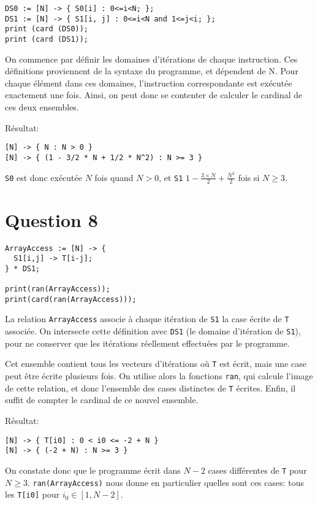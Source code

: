 \documentclass{article}
\begin{document}
\begin{lstlisting}
DS0 := [N] -> { S0[i] : 0<=i<N; };
DS1 := [N] -> { S1[i, j] : 0<=i<N and 1<=j<i; };
print (card (DS0));
print (card (DS1));
\end{lstlisting}

On commence par définir les domaines d'itérations de chaque instruction. Ces définitions proviennent de la syntaxe du programme, et dépendent de N.
Pour chaque élément dans ces domaines, l'instruction correspondante est exécutée exactement une fois.
Ainsi, on peut donc se contenter de calculer le cardinal de ces deux ensembles.

Résultat:
\begin{lstlisting}
[N] -> { N : N > 0 }
[N] -> { (1 - 3/2 * N + 1/2 * N^2) : N >= 3 }
\end{lstlisting}

\lstinline{S0} est donc exécutée $N$ fois quand $N>0$, et \lstinline{S1} $1-\frac{3\times N}{2} + \frac{N^2}{2}$ fois si $N\geq 3$.

\section*{Question 8}
\begin{lstlisting}
ArrayAccess := [N] -> {
  S1[i,j] -> T[i-j];
} * DS1;

print(ran(ArrayAccess));
print(card(ran(ArrayAccess)));
\end{lstlisting}

La relation \lstinline{ArrayAccess} associe à chaque itération de \lstinline{S1} la case écrite de \lstinline{T} associée.
On intersecte cette définition avec \lstinline{DS1} (le domaine d'itération de \lstinline{S1}), pour ne conserver que les itérations réellement effectuées par le programme.

Cet ensemble contient tous les vecteurs d'itérations où \lstinline{T} est écrit, mais une case peut être écrite plusieurs fois. On utilise alors la fonctions \lstinline{ran}, qui calcule l'image de cette relation, et donc l'ensemble des cases distinctes de \lstinline{T} écrites.
Enfin, il suffit de compter le cardinal de ce nouvel ensemble.

Résultat:
\begin{lstlisting}
[N] -> { T[i0] : 0 < i0 <= -2 + N }
[N] -> { (-2 + N) : N >= 3 }
\end{lstlisting}

On constate donc que le programme écrit dans $N-2$ cases différentes de \lstinline{T} pour $N\geq 3$.
\lstinline{ran(ArrayAccess)} nous donne en particulier quelles sont ces cases: tous les \lstinline{T[i0]} pour $i_0\in[1,N-2]$.
\end{document}

